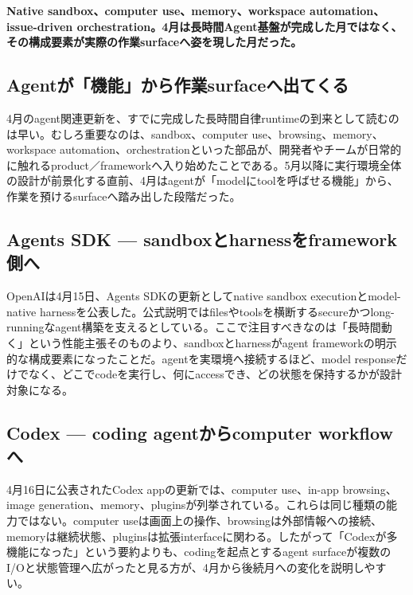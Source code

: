\noindent\textbf{Native sandbox、computer use、memory、workspace automation、issue-driven orchestration。4月は長時間Agent基盤が完成した月ではなく、その構成要素が実際の作業surfaceへ姿を現した月だった。}\autocite{src-1ecdad90bfb4,src-20e34cbfb714,src-c71ef79e3212,src-f9ff221789e0}

\subsection{Agentが「機能」から作業surfaceへ出てくる}

4月のagent関連更新を、すでに完成した長時間自律runtimeの到来として読むのは早い。むしろ重要なのは、sandbox、computer use、browsing、memory、workspace automation、orchestrationといった部品が、開発者やチームが日常的に触れるproduct／frameworkへ入り始めたことである。5月以降に実行環境全体の設計が前景化する直前、4月はagentが「modelにtoolを呼ばせる機能」から、作業を預けるsurfaceへ踏み出した段階だった。\autocite{src-1ecdad90bfb4,src-20e34cbfb714,src-c71ef79e3212,src-f9ff221789e0}


\subsection{Agents SDK — sandboxとharnessをframework側へ}

OpenAIは4月15日、Agents SDKの更新としてnative sandbox executionとmodel-native harnessを公表した。公式説明ではfilesやtoolsを横断するsecureかつlong-runningなagent構築を支えるとしている。ここで注目すべきなのは「長時間動く」という性能主張そのものより、sandboxとharnessがagent frameworkの明示的な構成要素になったことだ。agentを実環境へ接続するほど、model responseだけでなく、どこでcodeを実行し、何にaccessでき、どの状態を保持するかが設計対象になる。\autocite{src-1ecdad90bfb4}


\subsection{Codex — coding agentからcomputer workflowへ}

4月16日に公表されたCodex appの更新では、computer use、in-app browsing、image generation、memory、pluginsが列挙されている。これらは同じ種類の能力ではない。computer useは画面上の操作、browsingは外部情報への接続、memoryは継続状態、pluginsは拡張interfaceに関わる。したがって「Codexが多機能になった」という要約よりも、codingを起点とするagent surfaceが複数のI/Oと状態管理へ広がったと見る方が、4月から後続月への変化を説明しやすい。\autocite{src-20e34cbfb714}


